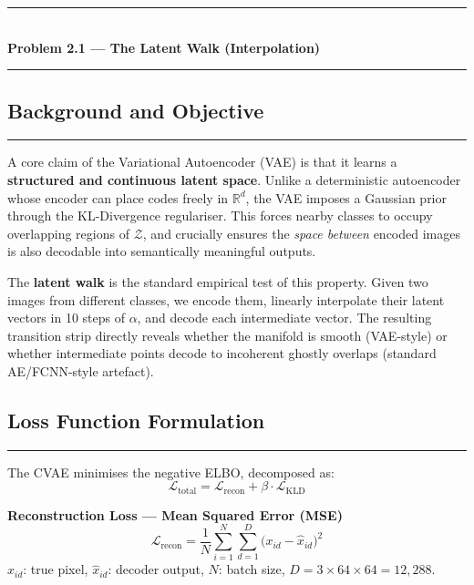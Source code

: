 \documentclass[11pt,a4paper]{article}
\begin{document}
\begin{center}
    \rule{\linewidth}{1.5pt}\\[5pt]
    {\large\bfseries Problem 2.1 --- The Latent Walk (Interpolation)}\\[4pt]
    \rule{\linewidth}{0.8pt}
\end{center}
\thispagestyle{fancy}

\subsection*{Background and Objective}
\noindent\rule{\linewidth}{0.4pt}

A core claim of the Variational Autoencoder (VAE) is that it learns a \textbf{structured and
continuous latent space}. Unlike a deterministic autoencoder whose encoder can place codes
freely in $\mathbb{R}^{d}$, the VAE imposes a Gaussian prior through the KL-Divergence
regulariser. This forces nearby classes to occupy overlapping regions of $\mathcal{Z}$, and
crucially ensures the \emph{space between} encoded images is also decodable into semantically
meaningful outputs.

The \textbf{latent walk} is the standard empirical test of this property. Given two images from
different classes, we encode them, linearly interpolate their latent vectors in 10 steps of
$\alpha$, and decode each intermediate vector. The resulting transition strip directly reveals
whether the manifold is smooth (VAE-style) or whether intermediate points decode to incoherent
ghostly overlaps (standard AE/FCNN-style artefact).

\subsection*{Loss Function Formulation}
\noindent\rule{\linewidth}{0.4pt}

The CVAE minimises the negative ELBO, decomposed as:
\[
    \mathcal{L}_{\text{total}} = \mathcal{L}_{\text{recon}} + \beta \cdot \mathcal{L}_{\text{KLD}}
\]

\textbf{Reconstruction Loss --- Mean Squared Error (MSE)}
\[
    \mathcal{L}_{\text{recon}}
    = \frac{1}{N}\sum_{i=1}^{N}\sum_{d=1}^{D}
      \bigl(x_{id} - \hat{x}_{id}\bigr)^{2}
\]
$x_{id}$: true pixel, $\hat{x}_{id}$: decoder output,
$N$: batch size, $D = 3\times64\times64 = 12{,}288$.
\end{document}
